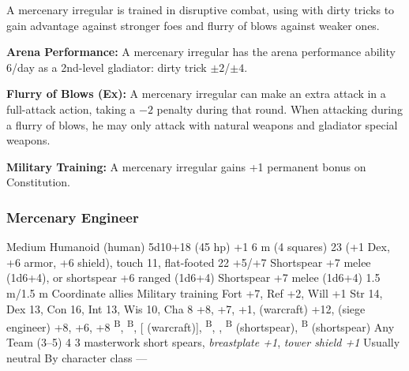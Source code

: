 
A mercenary irregular is trained in disruptive combat, using with dirty tricks to gain advantage against stronger foes and flurry of blows against weaker ones.

\textbf{Arena Performance:} A mercenary irregular has the arena performance ability 6/day as a 2nd-level gladiator: dirty trick $\pm2$/$\pm4$.

\textbf{Flurry of Blows (Ex):} A mercenary irregular can make an extra attack in a full-attack action, taking a $-2$ penalty during that round. When attacking during a flurry of blows, he may only attack with natural weapons and gladiator special weapons.

\textbf{Military Training:} A mercenary irregular gains +1 permanent bonus on Constitution.

\subsubsection{Mercenary Engineer}
\begin{MonsterStats}
{Medium Humanoid (human)}
{5d10+18 (45 hp)}
{+1}
{6 m (4 squares)}
{23 (+1 Dex, +6 armor, +6 shield), touch 11, flat-footed 22}
{+5/+7}
{Shortspear +7 melee (1d6+4), or shortspear +6 ranged (1d6+4)}
{Shortspear +7 melee (1d6+4)}
{1.5 m/1.5 m}
{Coordinate allies}
{Military training}
{Fort +7, Ref +2, Will +1}
{Str 14, Dex 13, Con 16, Int 13, Wis 10, Cha 8}
{
     +8,
     +7,
     +1,
     (warcraft) +12,
     (siege engineer) +8,
     +6,
     +8
}
{
    \textsuperscript{B},
    \textsuperscript{B},
     [ (warcraft)],
    \textsuperscript{B},
    ,
    \textsuperscript{B} (shortspear),
    \textsuperscript{B} (shortspear)
}
{Any}
{Team (3--5)}
{4}
{
    3 masterwork short spears,
    \emph{breastplate +1},
    \emph{tower shield +1}
}
{Usually neutral}
{By character class}
{---}
\end{MonsterStats}


